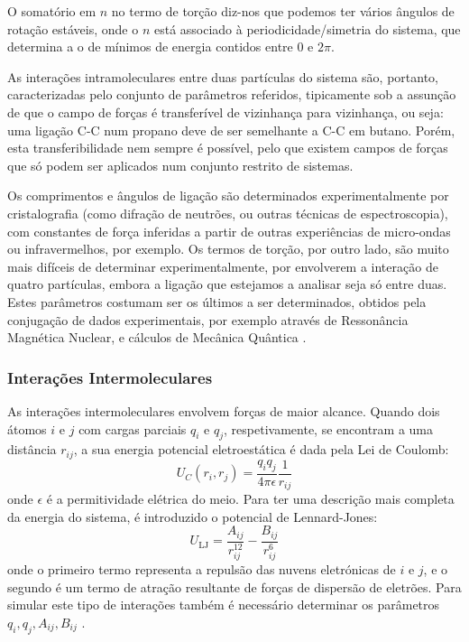\documentclass[12pt,a4paper]{article}
\begin{document}
	O somatório em $n$ no termo de torção diz-nos que podemos ter vários ângulos de rotação estáveis, onde o $n$ está associado à periodicidade/simetria do sistema, que determina a o de mínimos de energia contidos entre $0$ e $2\pi$.
	
	As interações intramoleculares entre duas partículas do sistema são, portanto, caracterizadas pelo conjunto de parâmetros referidos, tipicamente sob a assunção de que o campo de forças é transferível de vizinhança para vizinhança, ou seja: uma ligação C-C num propano deve de ser semelhante a C-C em butano. Porém, esta transferibilidade nem sempre é possível, pelo que existem campos de forças que só podem ser aplicados num conjunto restrito de sistemas.
	
	Os comprimentos e ângulos de ligação são determinados experimentalmente por cristalografia (como difração de neutrões, ou outras técnicas de espectroscopia), com constantes de força inferidas a partir de outras experiências de micro-ondas ou infravermelhos, por exemplo. Os termos de torção, por outro lado, são muito mais difíceis de determinar experimentalmente, por envolverem a interação de quatro partículas, embora a ligação que estejamos a analisar seja só entre duas. Estes parâmetros costumam ser os últimos a ser determinados, obtidos pela conjugação de dados experimentais, por exemplo através de Ressonância Magnética Nuclear, e cálculos de Mecânica Quântica \cite{weinerNewForceField1984,cheathamMolecularModelingNucleic2001,cornellSecondGenerationForce1995}.

\subsubsection{Interações Intermoleculares}
	As interações intermoleculares envolvem forças de maior alcance. Quando dois átomos $i$ e $j$ com cargas parciais $q_i$ e $q_j$, respetivamente, se encontram a uma distância $r_{ij}$, a sua energia potencial eletroestática é dada pela Lei de Coulomb:
	\begin{equation}
		U_C\left(r_i,r_j\right) = \dfrac{q_iq_j}{4\pi\epsilon}\dfrac{1}{r_{ij}}
	\end{equation}
	onde $\epsilon$ é a permitividade elétrica do meio. Para ter uma descrição mais completa da energia do sistema, é introduzido o potencial de Lennard-Jones:
	\begin{equation}
		U_{\text {LJ}}=\frac{A_{i j}}{r_{i j}^{12}}-\frac{B_{i j}}{r_{i j}^{6}}
	\end{equation}
	onde o primeiro termo representa a repulsão das nuvens eletrónicas de $i$ e $j$, e o segundo é um termo de atração resultante de forças de dispersão de eletrões. Para simular este tipo de interações também é necessário determinar os parâmetros $q_i,q_j,A_{ij},B_{ij}$ \cite{cornellSecondGenerationForce1995}.\paragraph{}
	
\end{document}
